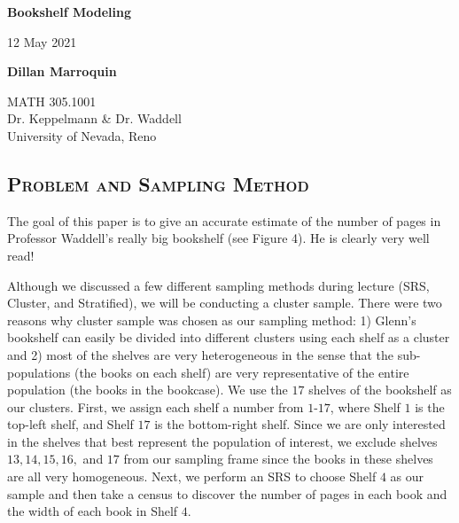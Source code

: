 \documentclass[10pt, twocolumn]{article}
\theoremstyle{definition}
\theoremstyle{remark}
\begin{document}
    \begin{titlepage}
        \begin{center}
            \vspace*{1cm}
                
            \Huge
            \textbf{Bookshelf Modeling}
            
            \vspace{0.5cm}
            \Large 12 May 2021
                
            \vspace{1.5cm}
                
            \textbf{Dillan Marroquin}
                
            \vfill
            
            \large
            MATH 305.1001\\
            Dr. Keppelmann \& Dr. Waddell\\
            University of Nevada, Reno\\
        \end{center}
    \end{titlepage}
    
    \subsection*{\textsc{Problem and Sampling Method}}{
        The goal of this paper is to give an accurate estimate of the number of pages in Professor Waddell's really big bookshelf (see Figure 4). He is clearly very well read! 
        
        Although we discussed a few different sampling methods during lecture (SRS, Cluster, and Stratified), we will be conducting a cluster sample. There were two reasons why cluster sample was chosen as our sampling method: 1) Glenn's bookshelf can easily be divided into different clusters using each shelf as a cluster and 2) most of the shelves are very heterogeneous in the sense that the sub-populations (the books on each shelf) are very representative of the entire population (the books in the bookcase). We use the $17$ shelves of the bookshelf as our clusters. First, we assign each shelf a number from $1$-$17$, where Shelf $1$ is the top-left shelf, and Shelf $17$ is the bottom-right shelf. Since we are only interested in the shelves that best represent the population of interest, we exclude shelves $13,14,15,16,$ and $17$ from our sampling frame since the books in these shelves are all very homogeneous. Next, we perform an SRS to choose Shelf $4$ as our sample and then take a census to discover the number of pages in each book and the width of each book in Shelf $4$.
    }
\end{document}
